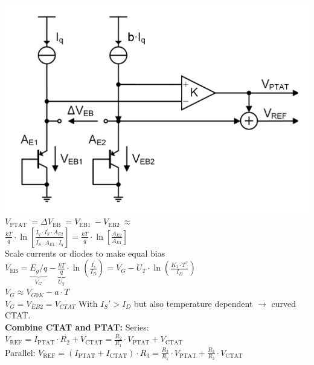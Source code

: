 \documentclass[5pt]{article}
\begin{document}
\begin{multicols*}{4}
\includegraphics[width=0.8\columnwidth]{images/gen_ptat_ctat.png}
$ V_{\text {PTAT }}=\Delta V_{\text {EB }}=V_{\text {EB1 }}-V_{\text {EB2 }} \approx $\\
$ \frac{k T}{q} \cdot \ln \left[\frac{I_{q} \cdot I_{S}^{\prime} \cdot A_{E 2}}{I_{S}^{\prime} \cdot A_{E 1} \cdot I_{q}}\right]=\frac{k T}{q} \cdot \ln \left[\frac{A_{E 2}}{A_{E 1}}\right] $\\
Scale currents or diodes to make equal bias\\
$ V_{\mathrm{EB}}=\underbrace{E_{g} / q}_{V_{G}}-\underbrace{\frac{k T}{q}}_{U_{T}} \cdot \ln \left(\frac{I_{s}^{\prime}}{I_{D}}\right)=V_{G}-U_{T} \cdot \ln \left(\frac{K_{1} \cdot T^{\gamma}}{I_{D}}\right) $\\
$ V_G \approx V_{G0K} - a \cdot T  $\\
$ V_G = V_{EB2} = V_{CTAT} $
With $ I_S' > I_D $ but also temperature dependent $ \rightarrow $ curved CTAT.\\
\textbf{Combine CTAT and PTAT:}
Series: $ V_{\mathrm{REF}}=I_{\mathrm{PTAT}} \cdot R_{2}+V_{\mathrm{CTAT}}=\frac{R_{2}}{R_{1}} \cdot V_{\mathrm{PTAT}}+V_{\mathrm{CTAT}} $\\
Parallel: $ V_{\mathrm{REF}}=\left(I_{\mathrm{PTAT}}+I_{\mathrm{CTAT}}\right) \cdot R_{3}=\frac{R_{3}}{R_{1}} \cdot V_{\mathrm{PTAT}}+\frac{R_{3}}{R_{2}} \cdot V_{\mathrm{CTAT}} $\\

\end{multicols*}
\end{document}
